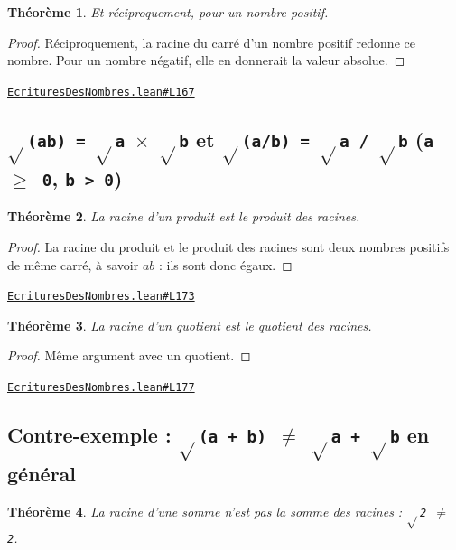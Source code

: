 \documentclass[11pt,a4paper]{article}
\theoremstyle{definition}
\theoremstyle{plain}
\newtheorem{theoreme}{Théorème}
\newcommand{\source}[2]{\par\smallskip\noindent\hfill{\footnotesize\href{#1}{\texttt{#2}}}\par\smallskip}
\begin{document}
\begin{theoreme}
Et réciproquement, pour un nombre positif.
\end{theoreme}

\begin{proof}
Réciproquement, la racine du carré d'un nombre positif redonne ce nombre. Pour un
nombre négatif, elle en donnerait la valeur absolue.
\end{proof}
\source{https://github.com/Commutator-IO/learn-lean/blob/main/cours/01-college/01-nombres-et-calculs/EcrituresDesNombres.lean\#L167}{EcrituresDesNombres.lean\#L167}

\subsection{\texttt{\(\sqrt{}\)(ab) = \(\sqrt{}\)a \(\times\) \(\sqrt{}\)b} et \texttt{\(\sqrt{}\)(a/b) = \(\sqrt{}\)a / \(\sqrt{}\)b} (\texttt{a \(\ge\) 0}, \texttt{b > 0})}

\begin{theoreme}
La racine d'un produit est le produit des racines.
\end{theoreme}

\begin{proof}
La racine du produit et le produit des racines sont deux nombres positifs de même
carré, à savoir $ab$ : ils sont donc égaux.
\end{proof}
\source{https://github.com/Commutator-IO/learn-lean/blob/main/cours/01-college/01-nombres-et-calculs/EcrituresDesNombres.lean\#L173}{EcrituresDesNombres.lean\#L173}

\begin{theoreme}
La racine d'un quotient est le quotient des racines.
\end{theoreme}

\begin{proof}
Même argument avec un quotient.
\end{proof}
\source{https://github.com/Commutator-IO/learn-lean/blob/main/cours/01-college/01-nombres-et-calculs/EcrituresDesNombres.lean\#L177}{EcrituresDesNombres.lean\#L177}

\subsection{Contre-exemple : \texttt{\(\sqrt{}\)(a + b) \(\ne\) \(\sqrt{}\)a + \(\sqrt{}\)b} en général}

\begin{theoreme}
La racine d'une somme n'est pas la somme des racines : \texttt{\(\sqrt{}\)2 \(\ne\) 2}.
\end{theoreme}
\end{document}
